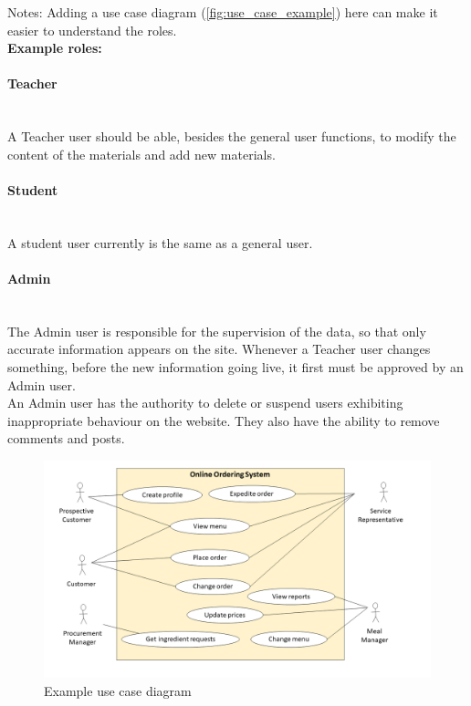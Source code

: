 \documentclass[12pt,a4paper]{article}
\begin{document}
\begin{spacing}{1.5}
    Notes: Adding a use case diagram (\autoref{fig:use_case_example}) here can make
    it easier to understand the roles. \\ \textbf{Example roles:}
    \paragraph{Teacher} \mbox{} \\ \indent A Teacher user should be able, besides the
    general user functions, to modify the content of the materials and add new
    materials.
    \paragraph{Student} \mbox{} \\ \indent A student user currently is the same as a
    general user.
    \paragraph{Admin} \mbox{} \\ \indent The Admin user is responsible for the
    supervision of the data, so that only accurate information appears on the site.
    Whenever a Teacher user changes something, before the new information going
    live, it first must be approved by an Admin user. \\ \indent An Admin user has
    the authority to delete or suspend users exhibiting inappropriate behaviour on
    the website. They also have the ability to remove comments and posts.
    \begin{figure}[!htb]
        \centering
        \includegraphics[width=15cm]{assets/use-case-example.png}
        \caption{Example use case diagram}
        \label{fig:use_case_example}
    \end{figure}
    \FloatBarrier


\end{spacing}
\end{document}
